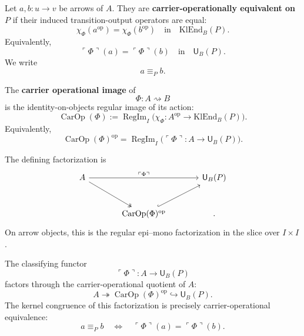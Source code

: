 \begin{definition}
Let \(a,b:u\to v\) be arrows of \(A\).  They are \textbf{carrier-operationally equivalent on \(P\)}
if their induced transition-output operators are equal:
\[
        \chi_\Phi(a^{\operatorname{op}})
        =
        \chi_\Phi(b^{\operatorname{op}})
        \quad\text{in}\quad
        \mathrm{KlEnd}_B(P).
\]
Equivalently,
\[
        \ulcorner\Phi\urcorner(a)
        =
        \ulcorner\Phi\urcorner(b)
        \quad\text{in}\quad
        \mathsf U_B(P).
\]
We write
\[
        a\equiv_P b.
\]
\end{definition}

\begin{definition}
The \textbf{carrier operational image} of
\[
        \Phi:A\rightsquigarrow B
\]
is the identity-on-objects regular image of its action:
\[
        \operatorname{CarOp}(\Phi)
        :=
        \operatorname{RegIm}_I
        \bigl(
            \chi_\Phi:
            A^{\operatorname{op}}\to\mathrm{KlEnd}_B(P)
        \bigr).
\]
Equivalently,
\[
        \operatorname{CarOp}(\Phi)^{\operatorname{op}}
        =
        \operatorname{RegIm}_I
        \bigl(
            \ulcorner\Phi\urcorner:
            A\to\mathsf U_B(P)
        \bigr).
\]
\end{definition}

The defining factorization is
\[
\begin{tikzcd}[column sep=large,row sep=large]
A
\ar[rr,"\ulcorner\Phi\urcorner"]
\ar[dr,swap,two heads]
&
&
\mathsf U_B(P)
\\
&
\operatorname{CarOp}(\Phi)^{\operatorname{op}}
\ar[ur,swap,hook]
&
.
\end{tikzcd}
\]
On arrow objects, this is the regular epi--mono factorization in the slice over \(I\times I\).

\begin{theorem}
\label{thm:extensional-collapse}
The classifying functor
\[
        \ulcorner\Phi\urcorner:A\longrightarrow\mathsf U_B(P)
\]
factors through the carrier-operational quotient of \(A\):
\[
        A
        \twoheadrightarrow
        \operatorname{CarOp}(\Phi)^{\operatorname{op}}
        \hookrightarrow
        \mathsf U_B(P).
\]
The kernel congruence of this factorization is precisely carrier-operational equivalence:
\[
        a\equiv_P b
        \quad\Longleftrightarrow\quad
        \ulcorner\Phi\urcorner(a)=\ulcorner\Phi\urcorner(b).
\]
\end{theorem}

